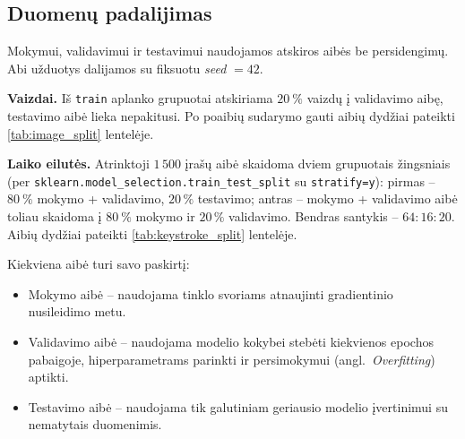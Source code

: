 \subsection{Duomenų padalijimas}
\label{subsec:cnn_duomenu_padalijimas}

Mokymui, validavimui ir testavimui naudojamos atskiros aibės be persidengimų. Abi užduotys dalijamos su fiksuotu \textit{seed} $= 42$.

\textbf{Vaizdai.} Iš \texttt{train} aplanko grupuotai atskiriama $20\ \%$ vaizdų į validavimo aibę, testavimo aibė lieka nepakitusi. Po poaibių sudarymo gauti aibių dydžiai pateikti \ref{tab:image_split} lentelėje.



\textbf{Laiko eilutės.} Atrinktoji $1\,500$ įrašų aibė skaidoma dviem grupuotais žingsniais (per \texttt{sklearn.model\_selection.train\_test\_split} su \texttt{stratify=y}): pirmas – $80\ \%$ mokymo + validavimo, $20\,\%$ testavimo; antras – mokymo + validavimo aibė toliau skaidoma į $80\ \%$ mokymo ir $20\,\%$ validavimo. Bendras santykis – $64{:}16{:}20$. Aibių dydžiai pateikti \ref{tab:keystroke_split} lentelėje.



Kiekviena aibė turi savo paskirtį:
\begin{itemize}
    \item Mokymo aibė – naudojama tinklo svoriams atnaujinti gradientinio nusileidimo metu.
    \item Validavimo aibė – naudojama modelio kokybei stebėti kiekvienos epochos pabaigoje, hiperparametrams parinkti ir persimokymui (angl.~\textit{Overfitting}) aptikti.
    \item Testavimo aibė – naudojama tik galutiniam geriausio modelio įvertinimui su nematytais duomenimis.
\end{itemize}
